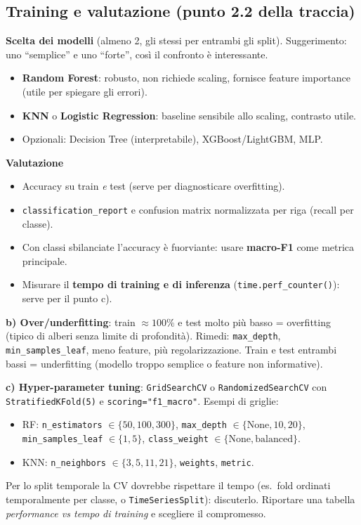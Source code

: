\subsection{Training e valutazione (punto 2.2 della traccia)}
\begin{strategia}
\textbf{Scelta dei modelli} (almeno 2, gli stessi per entrambi gli split).
Suggerimento: uno ``semplice'' e uno ``forte'', così il confronto è
interessante.
\begin{itemize}
  \item \textbf{Random Forest}: robusto, non richiede scaling, fornisce
        feature importance (utile per spiegare gli errori).
  \item \textbf{KNN} o \textbf{Logistic Regression}: baseline sensibile allo
        scaling, contrasto utile.
  \item Opzionali: Decision Tree (interpretabile), XGBoost/LightGBM, MLP.
\end{itemize}

\textbf{Valutazione}
\begin{itemize}
  \item Accuracy su train \emph{e} test (serve per diagnosticare
        overfitting).
  \item \texttt{classification\_report} e confusion matrix normalizzata per
        riga (recall per classe).
  \item Con classi sbilanciate l'accuracy è fuorviante: usare
        \textbf{macro-F1} come metrica principale.
  \item Misurare il \textbf{tempo di training e di inferenza}
        (\texttt{time.perf\_counter()}): serve per il punto c).
\end{itemize}

\textbf{b) Over/underfitting}: train $\approx 100\%$ e test molto più basso =
overfitting (tipico di alberi senza limite di profondità). Rimedi:
\texttt{max\_depth}, \texttt{min\_samples\_leaf}, meno feature, più
regolarizzazione. Train e test entrambi bassi = underfitting (modello troppo
semplice o feature non informative).

\textbf{c) Hyper-parameter tuning}: \texttt{GridSearchCV} o
\texttt{RandomizedSearchCV} con \texttt{StratifiedKFold(5)} e
\texttt{scoring="f1\_macro"}. Esempi di griglie:
\begin{itemize}
  \item RF: \texttt{n\_estimators} $\in\{50,100,300\}$, \texttt{max\_depth}
        $\in\{\text{None},10,20\}$, \texttt{min\_samples\_leaf}
        $\in\{1,5\}$, \texttt{class\_weight} $\in\{\text{None},\text{balanced}\}$.
  \item KNN: \texttt{n\_neighbors} $\in\{3,5,11,21\}$, \texttt{weights},
        \texttt{metric}.
\end{itemize}
Per lo split temporale la CV dovrebbe rispettare il tempo (es.\ fold
ordinati temporalmente per classe, o \texttt{TimeSeriesSplit}): discuterlo.
Riportare una tabella \emph{performance vs tempo di training} e scegliere il
compromesso.
\end{strategia}

